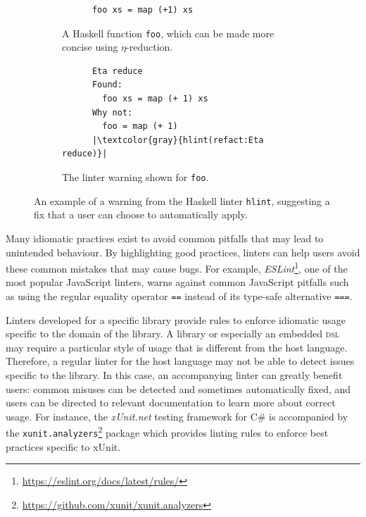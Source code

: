 \begin{figure}[htbp]
  \vspace{3ex} %
  \centering
  \begin{subfigure}{0.45\textwidth}
    \centering
    \begin{verbatim}
      foo xs = map (+1) xs
    \end{verbatim}
    \caption{A Haskell function \texttt{foo}, which can be made more concise using $\eta$-reduction.}
  \end{subfigure}
  \hfill
  \begin{subfigure}{0.45\textwidth}
    \centering
    \begin{verbatim}
      Eta reduce
      Found:
        foo xs = map (+ 1) xs
      Why not:
        foo = map (+ 1)
      |\textcolor{gray}{hlint(refact:Eta reduce)}|
    \end{verbatim}
    \caption{The linter warning shown for \texttt{foo}.}
  \end{subfigure}
  \caption{An example of a warning from the Haskell linter \texttt{hlint}, suggesting a fix that a user can choose to automatically apply.}
  \label{fig:hlint-example}
\end{figure}

Many idiomatic practices exist to avoid common pitfalls that may lead to unintended behaviour.
By highlighting good practices, linters can help users avoid these common mistakes that may cause bugs.
For example, \textit{ESLint}\footnote{\url{https://eslint.org/docs/latest/rules/}}, one of the most popular JavaScript linters, warns against common JavaScript pitfalls such as using the regular equality operator \texttt{==} instead of its type-safe alternative \texttt{===}.

Linters developed for a specific library provide rules to enforce idiomatic usage specific to the domain of the library.
A library or especially an embedded \textsc{dsl} may require a particular style of usage that is different from the host language.
Therefore, a regular linter for the host language may not be able to detect issues specific to the library.
In this case, an accompanying linter can greatly benefit users: common misuses can be detected and sometimes automatically fixed, and users can be directed to relevant documentation to learn more about correct usage.
For instance, the \textit{xUnit.net} testing framework for C\# is accompanied by the \texttt{xunit.analyzers}\footnote{\url{https://github.com/xunit/xunit.analyzers}} package which provides linting rules to enforce best practices specific to xUnit.

